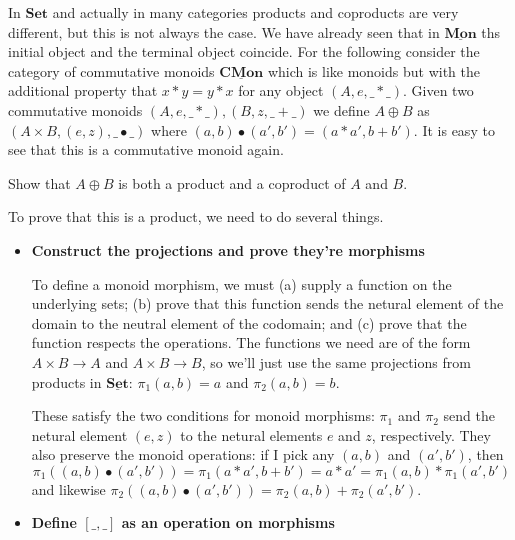\documentclass{article}
\newcommand{\Set}{\mathbf{Set}}
\newcommand{\cat}[1]{\underline{\mathbf{#1}}}
\begin{document}
In $\Set$ and actually in many categories products and coproducts are very different, but this is not always the case. We have already seen that in $\cat{Mon}$ ths initial object and the terminal object coincide. For the following consider the category of commutative monoids $\cat{CMon}$ which is like monoids but with the additional property that $x * y = y * x$ for any object $(A,e,\_*\_)$. Given two commutative monoids  $(A,e,\_*\_),  (B,z,\_+\_)$ we define $A \oplus B$ as $(A\times B,(e,z),\_ \bullet \_)$ where $(a,b) \bullet (a',b') = (a * a',b + b')$. It is easy to see that this is a commutative monoid again.
\begin{Exercise}
Show that $A \oplus B$ is both a product and a coproduct of $A$ and $B$.
\end{Exercise}
\begin{Answer}
  \Question
    To prove that this is a product, we need to do several things.
    \begin{itemize}
      \item \textbf{Construct the projections and prove they're morphisms}

        To define a monoid morphism, we must (a) supply a function on the underlying sets; (b) prove that this function sends the netural element of the domain to the neutral element of the codomain; and (c) prove that the function respects the operations. The functions we need are of the form $A\times B\to A$ and $A\times B\to B$, so we'll just use the same projections from products in $\cat{Set}$: $\pi_1(a,b)=a$ and $\pi_2(a,b)=b$.

        These satisfy the two conditions for monoid morphisms: $\pi_1$ and $\pi_2$ send the netural element $(e,z)$ to the netural elements $e$ and $z$, respectively. They also preserve the monoid operations: if I pick any $(a,b)$ and $(a',b')$, then
        \[ \pi_1((a,b)\bullet(a',b')) = \pi_1(a * a',b + b') = a * a' = \pi_1(a,b) * \pi_1(a',b') \]
        and likewise $\pi_2((a,b)\bullet(a',b'))=\pi_2(a,b) + \pi_2(a',b')$. 
      \item \textbf{Define $[\_,\_]$ as an operation on morphisms}


\end{itemize}
\end{Answer}
\end{document}
